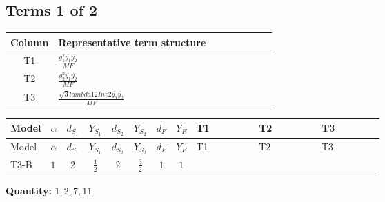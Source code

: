 \documentclass[8pt]{article}
\begin{document}
\begin{landscape}
\subsection*{Terms 1 of 2}
\begin{center}
\begin{tabular}{@{}c >{\raggedright\arraybackslash}p{0.82\linewidth}@{}}
\toprule
Column & Representative term structure \\
\midrule
T1 & \(\displaystyle \frac{g_{1}^{2} \overline{y_{1}} \overline{y_{2}}}{MF}\) \\
\midrule
T2 & \(\displaystyle \frac{g_{2}^{2} \overline{y_{1}} \overline{y_{2}}}{MF}\) \\
\midrule
T3 & \(\displaystyle \frac{\sqrt{3} lambda12Inv2 \overline{y_{1}} \overline{y_{2}}}{MF}\) \\
\midrule
\bottomrule
\end{tabular}
\end{center}
\smallskip
\tiny
\begin{longtable}{@{}llcccccc >{\raggedright\arraybackslash}p{0.21\linewidth} >{\raggedright\arraybackslash}p{0.21\linewidth} >{\raggedright\arraybackslash}p{0.21\linewidth}@{}}
\toprule
Model & $\alpha$ & $d_{S_1}$ & $Y_{S_1}$ & $d_{S_2}$ & $Y_{S_2}$ & $d_F$ & $Y_F$ & T1 & T2 & T3 \\
\midrule
\endfirsthead
\toprule
Model & $\alpha$ & $d_{S_1}$ & $Y_{S_1}$ & $d_{S_2}$ & $Y_{S_2}$ & $d_F$ & $Y_F$ & T1 & T2 & T3 \\
\midrule
\endhead
T3-B & $1$ & $2$ & $\frac{1}{2}$ & $2$ & $\frac{3}{2}$ & $1$ & $1$ & \scriptsize\adjustbox{max width=\linewidth}{$\begin{gathered} - \frac{3 g_{1}^{2} \overline{y_{1}} \overline{y_{2}}}{4 MF}\end{gathered}$} & \scriptsize\adjustbox{max width=\linewidth}{$\begin{gathered} - \frac{3 g_{2}^{2} \overline{y_{1}} \overline{y_{2}}}{8 MF}\end{gathered}$} & \scriptsize\adjustbox{max width=\linewidth}{$\begin{gathered} - \frac{\sqrt{3} lambda12Inv2 \overline{y_{1}} \overline{y_{2}}}{6 MF}\end{gathered}$} \\
\midrule
\bottomrule
\end{longtable}
\clearpage
\noindent\textbf{Quantity: }$\mathrm{1,2,7,11}$\par\smallskip

\end{landscape}
\end{document}
